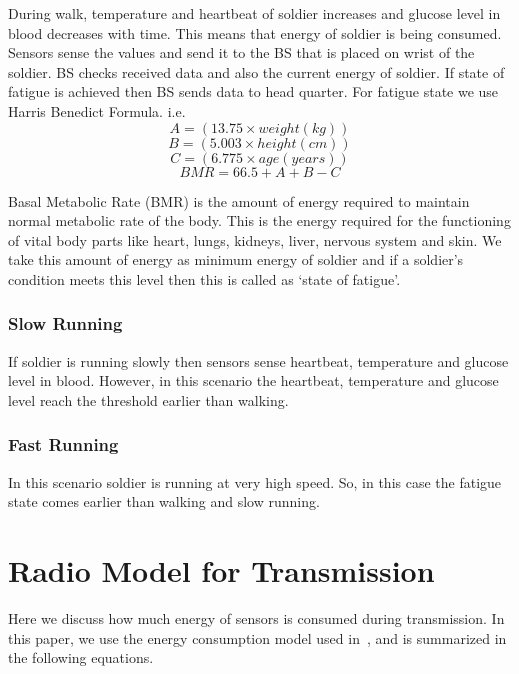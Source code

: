 \documentclass[journal]{IEEEtran}
\begin{document}
During walk, temperature and heartbeat of soldier increases and glucose level in blood decreases with time. This means that energy of soldier is being consumed.
Sensors sense the values and send it to the BS that is placed on wrist of the soldier. BS checks received data and also the current energy of soldier. If state of
 fatigue is achieved then BS sends data to head quarter. For fatigue state we use Harris Benedict Formula. i.e.
\begin{equation}
    A=(13.75 \times weight( kg))
\end{equation}
\begin{equation}
    B=(5.003 \times height (cm))
\end{equation}
\begin{equation}
    C=(6.775 \times age (years))
\end{equation}
\begin{equation}
    BMR=66.5 + A + B - C
\end{equation}


Basal Metabolic Rate (BMR) is the amount of energy required to maintain normal metabolic rate of the body. This is the energy required for the functioning of vital
body parts like heart, lungs, kidneys, liver, nervous system and skin. We take this amount of energy as minimum energy of soldier and if a soldier's condition meets
 this level then this is called as `state of fatigue'.
\subsubsection{Slow Running}
If soldier is running slowly then sensors sense heartbeat, temperature and glucose level in blood. However, in this scenario the heartbeat, temperature and glucose
level reach the threshold earlier than walking.
\subsubsection{Fast Running}
In this scenario soldier is running at very high speed. So, in this case the fatigue state comes earlier than walking and slow running.

\section{Radio Model for Transmission}
Here we discuss how much energy of sensors is consumed during transmission. In this paper, we use the energy consumption model used in~\cite{15}, and is summarized
 in the following equations.
\end{document}
